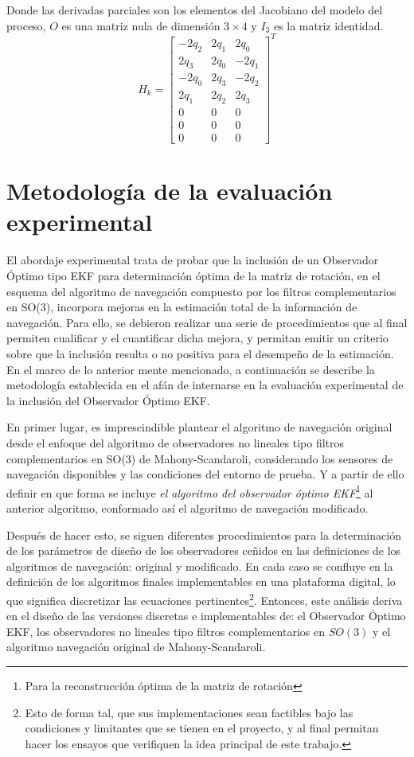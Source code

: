 \documentclass[conference]{IEEEtran}
\begin{document}
Donde las derivadas parciales son los elementos del Jacobiano del modelo del proceso, $O$ es una matriz nula de dimensión $3\times 4$ y $I_3$ es la matriz identidad.
\begin{equation}\label{diseekf_ecc14}
H_k=\begin{bmatrix}
-2q_2&2q_1&2q_0\\
2q_3&2q_0&-2q_1\\
-2q_0&2q_3&-2q_2\\
2q_1&2q_2&2q_3\\
0&0&0\\
0&0&0\\
0&0&0
\end{bmatrix}^T
\end{equation}
\section{Metodología de la evaluación experimental}\label{Metodologia}
El abordaje experimental trata de probar que la inclusión de un Observador Óptimo tipo EKF para determinación óptima de la matriz de rotación, en el esquema del algoritmo de navegación compuesto por los filtros complementarios en SO(3), incorpora mejoras en la estimación total de la información de navegación. Para ello, se debieron realizar una serie de procedimientos que al final permiten cualificar y el cuantificar dicha mejora, y permitan emitir un criterio sobre que la inclusión resulta o no positiva para el desempeño de la estimación. En el marco de lo anterior mente mencionado, a continuación se describe la metodología establecida en el afán de internarse en la evaluación experimental de la inclusión del Observador Óptimo EKF.\par
En primer lugar, es imprescindible plantear el algoritmo de navegación original desde el enfoque del algoritmo de observadores no lineales tipo filtros complementarios en SO(3) de Mahony-Scandaroli, considerando los sensores de navegación disponibles y las condiciones del entorno de prueba. Y a partir de ello definir en que forma se incluye \emph{el algoritmo del observador óptimo EKF}\footnote{Para la reconstrucción óptima de la matriz de rotación} al anterior algoritmo, conformado así el algoritmo de navegación modificado.\par
Después de hacer esto, se siguen diferentes procedimientos para la determinación de los parámetros de diseño de los observadores ceñidos en las definiciones de los algoritmos de navegación: original y modificado. En cada caso se confluye en la definición de los algoritmos finales implementables en una plataforma digital, lo que significa discretizar las ecuaciones pertinentes\footnote{ Esto de forma tal, que sus implementaciones sean factibles bajo las condiciones y limitantes que se tienen en el proyecto, y al final permitan hacer los ensayos que verifiquen la idea principal de este trabajo.}. Entonces, este análisis deriva en el diseño de las versiones discretas e implementables de: el Observador Óptimo EKF, los observadores no lineales tipo filtros complementarios en $SO(3)$ y el algoritmo navegación original de Mahony-Scandaroli.\par
\end{document}
